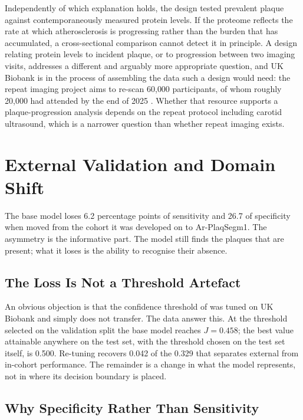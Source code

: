 Independently of which explanation holds, the design tested prevalent plaque against
contemporaneously measured protein levels. If the proteome reflects the rate at which
atherosclerosis is progressing rather than the burden that has accumulated, a cross-sectional
comparison cannot detect it in principle. A design relating protein levels to incident plaque, or
to progression between two imaging visits, addresses a different and arguably more appropriate
question, and UK Biobank is in the process of assembling the data such a design would need: the
repeat imaging project aims to re-scan 60{,}000 participants, of whom roughly 20{,}000 had
attended by the end of 2025 \cite{ukbiobank_repeat_imaging}. Whether that resource supports a
plaque-progression analysis depends on the repeat protocol including carotid ultrasound, which
is a narrower question than whether repeat imaging exists.

\section{External Validation and Domain Shift}
\label{sec:discussion-domain-shift}

The base model loses 6.2 percentage points of sensitivity and 26.7 of specificity when moved from
the cohort it was developed on to Ar-PlaqSegm1. The asymmetry is the informative part. The model
still finds the plaques that are present; what it loses is the ability to recognise their absence.

\subsection{The Loss Is Not a Threshold Artefact}

An obvious objection is that the confidence threshold of \textcite{omarov2024deep} was tuned on
UK Biobank and simply does not transfer. The data answer this. At the threshold selected on the
validation split the base model reaches $J = 0.458$; the best value attainable anywhere on the
test set, with the threshold chosen on the test set itself, is 0.500. Re-tuning recovers 0.042 of
the 0.329 that separates external from in-cohort performance. The remainder is a change in what
the model represents, not in where its decision boundary is placed.

\subsection{Why Specificity Rather Than Sensitivity}

